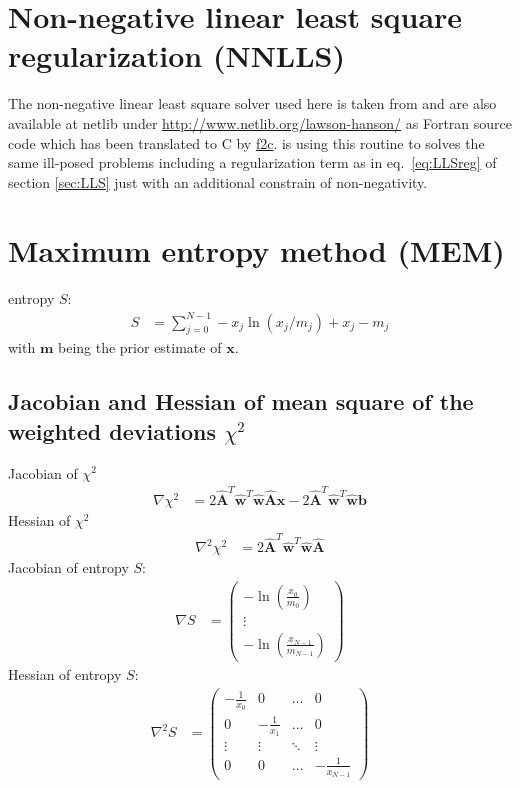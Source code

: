 \section{Non-negative linear least square regularization (NNLLS)}\label{sec:NNLLS}
The non-negative linear least square solver used here is taken from \cite{Lawson1995a} and are also available at netlib under
\url{http://www.netlib.org/lawson-hanson/} as Fortran source code which has been translated to C by \hyperref[https://www.netlib.org/f2c/]{f2c}. \SASfit is using this routine to solves the same ill-posed problems including a regularization term as in eq.\ \ref{eq:LLSreg} of section \ref{sec:LLS} just with an additional constrain of non-negativity.


\clearpage
\section{Maximum entropy method (MEM)}
entropy $S$:
\begin{align}
S&= \sum_{j=0}^{N-1} -x_j\ln\left(x_j/m_j\right) +x_j-m_j
\end{align}
with $\mathbf{m}$ being the prior estimate of $\mathbf{x}$.

\subsection{Jacobian and Hessian of mean square of the weighted deviations $\chi^2$}



Jacobian of $\chi^2$
\begin{align}
  \nabla \chi^2 &= 2\hat{\mathbf{A}}^T\hat{\mathbf{w}}^T\hat{\mathbf{w}}\hat{\mathbf{A}}\mathbf{x}-2\hat{\mathbf{A}}^T\hat{\mathbf{w}}^T\hat{\mathbf{w}}\mathbf{b}
\end{align}
Hessian of $\chi^2$
\begin{align}
  \nabla^2 \chi^2 &= 2\hat{\mathbf{A}}^T\hat{\mathbf{w}}^T\hat{\mathbf{w}}\hat{\mathbf{A}}
\end{align}
Jacobian of entropy $S$:
\begin{align}
  \nabla  S &= \begin{pmatrix}
    -\ln \left(\frac{x_0}{m_0}\right) \\
   \vdots \\
    -\ln \left(\frac{x_{N-1}}{m_{N-1}}\right)
  \end{pmatrix}
\end{align}
Hessian of entropy $S$:
\begin{align}
  \nabla^2  S &=
  \begin{pmatrix}
    -\frac{1}{x_0} & 0 & \dots & 0 \\
    0 & -\frac{1}{x_1} & \dots & 0 \\
    \vdots & \vdots & \ddots & \vdots \\
    0 & 0 & \dots & -\frac{1}{x_{N-1}}
  \end{pmatrix}
\end{align}

